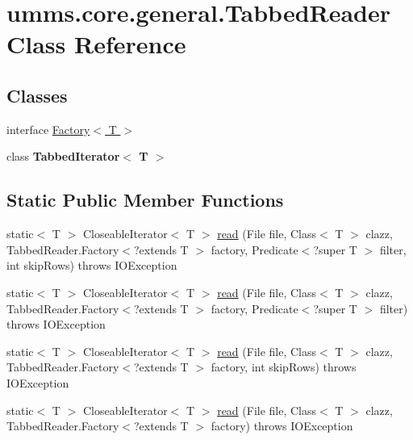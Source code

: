 \hypertarget{classumms_1_1core_1_1general_1_1_tabbed_reader}{\section{umms.\+core.\+general.\+Tabbed\+Reader Class Reference}
\label{classumms_1_1core_1_1general_1_1_tabbed_reader}
}
\subsection*{Classes}
\begin{DoxyCompactItemize}
\item 
interface \hyperlink{interfaceumms_1_1core_1_1general_1_1_tabbed_reader_1_1_factory_3_01_t_01_4}{Factory$<$ T $>$}
\item 
class {\bfseries Tabbed\+Iterator$<$ T $>$}
\end{DoxyCompactItemize}
\subsection*{Static Public Member Functions}
\begin{DoxyCompactItemize}
\item 
static$<$ T $>$ Closeable\+Iterator$<$ T $>$ \hyperlink{classumms_1_1core_1_1general_1_1_tabbed_reader_ac1acfdb8f7a47bb5c54a21fe166ad86a}{read} (File file, Class$<$ T $>$ clazz, Tabbed\+Reader.\+Factory$<$?extends T $>$ factory, Predicate$<$?super T $>$ filter, int skip\+Rows)  throws I\+O\+Exception 
\item 
static$<$ T $>$ Closeable\+Iterator$<$ T $>$ \hyperlink{classumms_1_1core_1_1general_1_1_tabbed_reader_a2f9792bca4b9046a0c94f4176d46593c}{read} (File file, Class$<$ T $>$ clazz, Tabbed\+Reader.\+Factory$<$?extends T $>$ factory, Predicate$<$?super T $>$ filter)  throws I\+O\+Exception 
\item 
static$<$ T $>$ Closeable\+Iterator$<$ T $>$ \hyperlink{classumms_1_1core_1_1general_1_1_tabbed_reader_acaebc610a8a7e5448c8a72b97c7cdf80}{read} (File file, Class$<$ T $>$ clazz, Tabbed\+Reader.\+Factory$<$?extends T $>$ factory, int skip\+Rows)  throws I\+O\+Exception 
\item 
static$<$ T $>$ Closeable\+Iterator$<$ T $>$ \hyperlink{classumms_1_1core_1_1general_1_1_tabbed_reader_a6dd5085ce10a90a0607d28d178070635}{read} (File file, Class$<$ T $>$ clazz, Tabbed\+Reader.\+Factory$<$?extends T $>$ factory)  throws I\+O\+Exception 
\end{DoxyCompactItemize}


